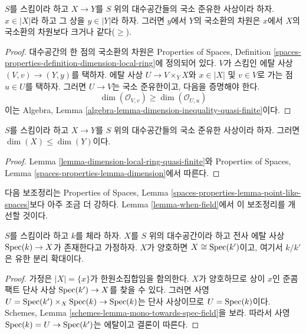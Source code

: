 \begin{lemma}
\label{lemma-dimension-local-ring-quasi-finite}
$S$를 스킴이라 하고 $X \to Y$를 $S$ 위의 대수공간들의 국소 준유한
사상이라 하자. $x \in |X|$라 하고 그 상을 $y \in |Y|$라 하자.
그러면 $y$에서 $Y$의 국소환의 차원은 $x$에서 $X$의 국소환의
차원보다 크거나 같다($\geq$).
\end{lemma}

\begin{proof}
대수공간의 한 점의 국소환의 차원은 Properties of Spaces, Definition
\ref{spaces-properties-definition-dimension-local-ring}에 정의되어 있다.
$V$가 스킴인 에탈 사상 $(V, v) \to (Y, y)$를 택하자. 에탈 사상
$U \to V \times_Y X$와 $x \in |X|$ 및 $v \in V$로 가는 점
$u \in U$를 택하자. 그러면 $U \to V$는 국소 준유한이고, 다음을
증명해야 한다.
$$
\dim(\mathcal{O}_{V, v}) \geq \dim(\mathcal{O}_{U, u})
$$
이는 Algebra, Lemma
\ref{algebra-lemma-dimension-inequality-quasi-finite}이다.
\end{proof}

\begin{lemma}
\label{lemma-dimension-quasi-finite}
$S$를 스킴이라 하고 $X \to Y$를 $S$ 위의 대수공간들의 국소 준유한
사상이라 하자. 그러면 $\dim(X) \leq \dim(Y)$이다.
\end{lemma}

\begin{proof}
Lemma \ref{lemma-dimension-local-ring-quasi-finite}와 Properties of
Spaces, Lemma \ref{spaces-properties-lemma-dimension}에서 따른다.
\end{proof}

\noindent
다음 보조정리는 Properties of Spaces, Lemma
\ref{spaces-properties-lemma-point-like-spaces}보다 아주 조금 더 강하다.
Lemma \ref{lemma-when-field}에서 이 보조정리를 개선할 것이다.

\begin{lemma}
\label{lemma-decent-point-like-spaces}
$S$를 스킴이라 하고 $k$를 체라 하자. $X$를 $S$ 위의 대수공간이라
하고 전사 에탈 사상 $\mathop{\mathrm{Spec}}(k) \to X$가 존재한다고 가정하자.
$X$가 양호하면 $X \cong \mathop{\mathrm{Spec}}(k')$이고, 여기서 $k/k'$은 유한 분리
확대이다.
\end{lemma}

\begin{proof}
가정은 $|X| = \{x\}$가 한원소집합임을 함의한다. $X$가 양호하므로
상이 $x$인 준콤팩트 단사 사상 $\mathop{\mathrm{Spec}}(k') \to X$를 찾을 수 있다.
그러면 사영
$U = \mathop{\mathrm{Spec}}(k') \times_X \mathop{\mathrm{Spec}}(k) \to \mathop{\mathrm{Spec}}(k)$는 단사 사상이므로
$U = \mathop{\mathrm{Spec}}(k)$이다. Schemes, Lemma
\ref{schemes-lemma-mono-towards-spec-field}을 보라. 따라서 사영
$\mathop{\mathrm{Spec}}(k) = U \to \mathop{\mathrm{Spec}}(k')$는 에탈이고 결론이 따른다.
\end{proof}




